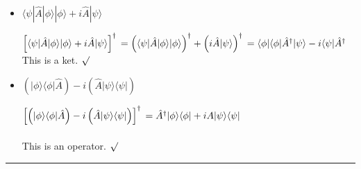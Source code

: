 \documentclass[fleqn]{article}
\begin{document}
\begin{itemize}
    \item $\langle \psi | \hat{A} | \phi \rangle | \phi \rangle + i \hat{A} | \psi \rangle$

      \textcolor{hwColor}{
        $
          \left[\langle \psi | \hat{A} | \phi \rangle | \phi \rangle + i \hat{A} | \psi \rangle\right]^{\dagger} \\
          \\
          =\left(\langle \psi | \hat{A} | \phi \rangle | \phi \rangle \right)^{\dagger}+ \left(i \hat{A} | \psi \rangle\right)^{\dagger} \\
          \\
          =\langle \phi | \langle \phi | \hat{A}^{\dagger} | \psi \rangle-i \langle \psi | \hat{A}^{\dagger} \\
          \\ 
        $
        This is a ket. $\surd$
      }
    
    \item $\left(| \phi \rangle  \langle \phi | \hat{A} \right)-i\left(\hat{A} | \psi \rangle \langle \psi |\right)$ 

      \textcolor{hwColor}{
        $
          \left[\left(| \phi \rangle  \langle \phi | \hat{A} \right)-i\left(\hat{A} | \psi \rangle \langle \psi |\right)\right]^{\dagger} \\
          \\
          =\hat{A}^{\dagger} | \phi \rangle \langle \phi |+iA |\psi \rangle \langle \psi |
        $
        \\
        \\
        This is an operator.  $\surd$
      }

  \end{itemize}

  \rule{15cm}{1pt}
\end{document}
